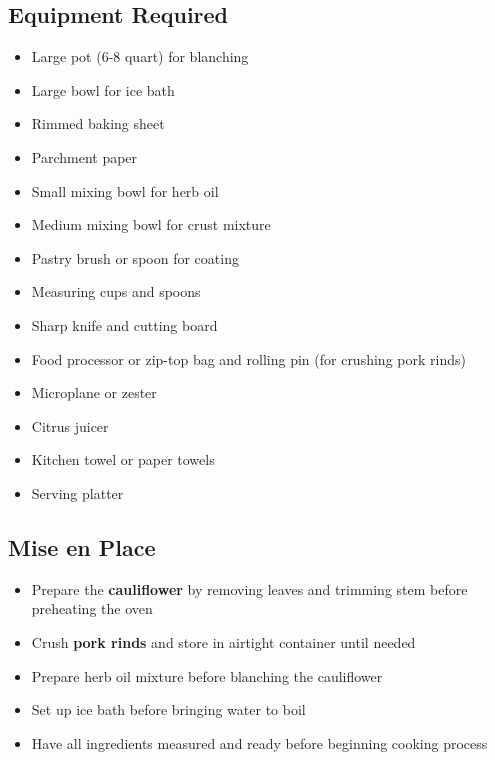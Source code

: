 \documentclass[11pt,letterpaper]{article}
\begin{document}
{\small
\setlength{\columnsep}{20pt}
\setlength{\multicolsep}{6pt}
\begin{multicols}{2}
\setlength{\parindent}{0pt}
\setlength{\parskip}{4pt}

\subsection*{Equipment Required}
\begin{itemize}
    \item Large pot (6-8 quart) for blanching
    \item Large bowl for ice bath
    \item Rimmed baking sheet
    \item Parchment paper
    \item Small mixing bowl for herb oil
    \item Medium mixing bowl for crust mixture
    \item Pastry brush or spoon for coating
    \item Measuring cups and spoons
    \item Sharp knife and cutting board
    \item Food processor or zip-top bag and rolling pin (for crushing pork rinds)
    \item Microplane or zester
    \item Citrus juicer
    \item Kitchen towel or paper towels
    \item Serving platter
\end{itemize}

\subsection*{Mise en Place}
\begin{itemize}
    \item Prepare the \textbf{cauliflower} by removing leaves and trimming stem before preheating the oven
    \item Crush \textbf{pork rinds} and store in airtight container until needed
    \item Prepare herb oil mixture before blanching the cauliflower
    \item Set up ice bath before bringing water to boil
    \item Have all ingredients measured and ready before beginning cooking process
\end{itemize}


\end{multicols}}
\end{document}
